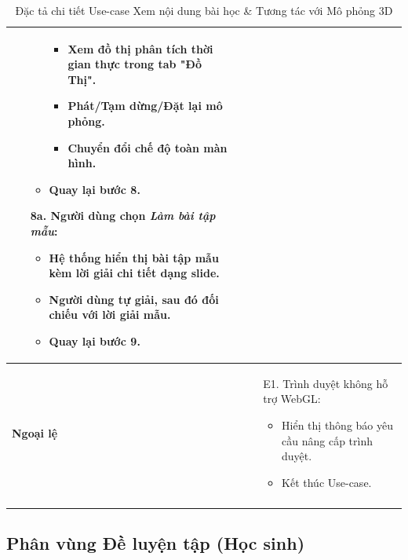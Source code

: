 \begin{longtable}{|p{}|p{}|}
\begin{enumerate}[topsep=2pt, itemsep=0pt]
\begin{itemize}[topsep=0pt, itemsep=0pt]
\begin{itemize}[topsep=0pt, itemsep=0pt]
            \item Xem đồ thị phân tích thời gian thực trong tab "Đồ Thị".
            \item Phát/Tạm dừng/Đặt lại mô phỏng.
            \item Chuyển đổi chế độ toàn màn hình.
        \end{itemize}
        \item Quay lại bước 8.
    \end{itemize}
    \item[8a.] Người dùng chọn \textit{Làm bài tập mẫu}:
    \begin{itemize}[topsep=0pt, itemsep=0pt]
        \item Hệ thống hiển thị bài tập mẫu kèm lời giải chi tiết dạng slide.
        \item Người dùng tự giải, sau đó đối chiếu với lời giải mẫu.
        \item Quay lại bước 9.
    \end{itemize}
\end{enumerate} \\
\hline
\textbf{Ngoại lệ} &
\vspace{-\baselineskip}
\begin{enumerate}[topsep=2pt, itemsep=0pt]
    \item[E1.] Trình duyệt không hỗ trợ WebGL:
    \begin{itemize}[topsep=0pt, itemsep=0pt]
        \item Hiển thị thông báo yêu cầu nâng cấp trình duyệt.
        \item Kết thúc Use-case.
    \end{itemize}
\end{enumerate} \\
\hline
\caption{Đặc tả chi tiết Use-case Xem nội dung bài học \& Tương tác với Mô phỏng 3D}
\label{table:uc-view-lesson}
\end{longtable}

\clearpage

\subsection{Phân vùng Đề luyện tập (Học sinh)}

